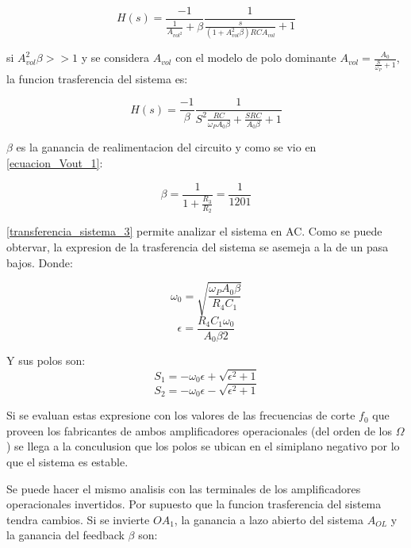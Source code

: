\begin{equation} H (s) = \frac{-1}{\frac{1}{A_{vol^2}}+\beta}\frac{1}{\frac{s}{(1+A_{vol}^2\beta)RC A_{vol}}+1} \label{transferencia_sistema_2}  \end{equation}

si $A_{vol}^2 \beta >> 1 $  y se considera $A_{vol}$ con el modelo de polo dominante $A_{vol} = \frac{A_0}{\frac{S}{\omega_P}+1}$, la funcion trasferencia del sistema es:

\begin{equation} H (s) = \frac{-1}{\beta} \frac{1}{S^2\frac{RC}{\omega_P A_0 \beta} + \frac{S R C}{A_0 \beta} +1 } \label{transferencia_sistema_3}  \end{equation}

$\beta$ es la ganancia de realimentacion del circuito y como se vio en \ref{ecuacion_Vout_1}:

\begin{equation} \beta =  \frac{1}{1+ \frac{R_3}{R_2}} = \frac{1}{1201} \label{beta}  \end{equation}

\ref{transferencia_sistema_3} permite analizar el sistema en AC. Como se puede obtervar, la expresion de la trasferencia del sistema se asemeja a la de un pasa bajos. Donde:


\begin{displaymath} \omega_0 = \sqrt{\frac{\omega_P A_{0} \beta}{R_4 C_1}} \end{displaymath}
\begin{displaymath} \epsilon = \frac{R_4 C_1 \omega_0}{A_0 \beta 2} \end{displaymath}

Y sus polos son:
\begin{displaymath} S_1 = -\omega_0 \epsilon + \sqrt{\epsilon^2 + 1} \end{displaymath}
\begin{displaymath} S_2 = -\omega_0 \epsilon - \sqrt{\epsilon^2 + 1} \end{displaymath}

Si se evaluan estas expresione con los valores de las frecuencias de corte $f_0$ que proveen los fabricantes de ambos amplificadores operacionales (del orden de los $\Omega$ ) se llega a la conculusion que los polos 
se ubican en el simiplano negativo por lo que el sistema es estable. 

Se puede hacer el mismo analisis con las terminales de los amplificadores operacionales invertidos. Por supuesto que la funcion trasferencia del sistema tendra cambios. Si se invierte $OA_1$, la ganancia a lazo abierto del sistema $A_{OL}$ y la ganancia del feedback $\beta$ son:

